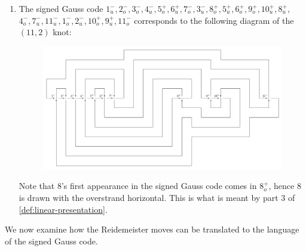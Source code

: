 \begin{example}
\begin{enumerate}
\begin{figure}[H]
      \end{figure}
    \item The signed Gauss code $1^-_u, 2^-_o, 3^-_o,
      4^-_u, 5^+_o, 6^+_u, 7^-_o, 3^-_u, 8^+_o, 5^+_u, 6^+_o, 9^+_o,
      10^+_u, 8^+_u,$ $ 4^-_o, 7^-_u, 11^-_u, 1^-_o, 2^-_u, 10^+_o,
      9^+_u, 11^-_o$ corresponds to the following diagram of the
      \hypertarget{11-2-example}{$(11,2)$} knot:
      \begin{figure}[H]
        \centering
        \includegraphics[scale=.5]{figures/background/11_2_9.pdf}
      \end{figure}
      Note that $8$'s first appearance in the signed Gauss code comes in
      $8^+_o$, hence $8$ is drawn with the overstrand horizontal. This
      is what is meant by part 3 of
      \cref{def:linear-presentation}.\qedhere
  \end{enumerate}
\end{example}
We now examine how the Reidemeister moves can be translated to the
language of the signed Gauss code.

